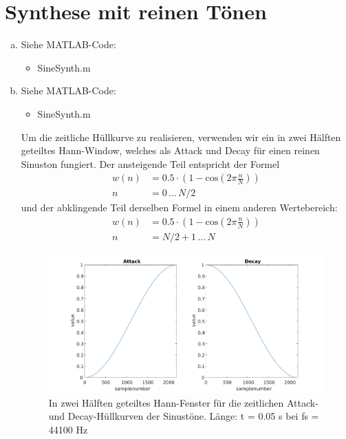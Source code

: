 \chapter{Synthese mit reinen Tönen}


\begin{enumerate}[a)]
\item Siehe MATLAB-Code:
\begin{itemize}
\item
SineSynth.m
\end{itemize}
\item
Siehe MATLAB-Code:
\begin{itemize}
\item
SineSynth.m
\end{itemize}
\vspace{\baselineskip}
Um die zeitliche Hüllkurve zu realisieren, verwenden wir ein in zwei Hälften geteiltes Hann-Window, welches als Attack und Decay für einen reinen Sinuston fungiert. Der ansteigende Teil entspricht der Formel
\begin{align*}
w(n) &= 0.5 \cdot (1- \mathrm{cos}(2 \pi \frac{n}{N})) \\
n &= 0\,...\,N/2
\end{align*}
und der abklingende Teil derselben Formel in einem anderen Wertebereich:
\begin{align*}
w(n) &= 0.5 \cdot (1- \mathrm{cos}(2 \pi \frac{n}{N})) \\
n &= N/2+1\,...\,N
\end{align*}
\begin{figure}
  \centering
      \includegraphics[width=\textwidth]{Figures/envelopeplot}
 \caption{In zwei Hälften geteiltes Hann-Fenster für die zeitlichen Attack- und Decay-Hüllkurven der Sinustöne. Länge: t = 0.05 s bei fs = 44100 Hz}
	\label{fig:env}
\end{figure}
\end{enumerate}
